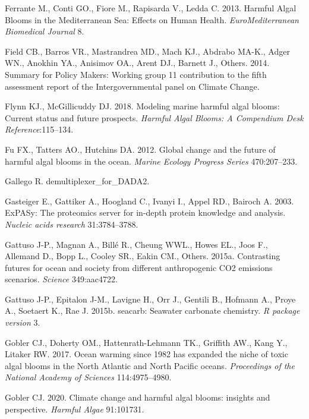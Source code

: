 \documentclass[
]{article}
\begin{document}
\leavevmode\hypertarget{ref-ferrante2013harmful}{}%
Ferrante M., Conti GO., Fiore M., Rapisarda V., Ledda C. 2013. Harmful
Algal Blooms in the Mediterranean Sea: Effects on Human Health.
\emph{EuroMediterranean Biomedical Journal} 8.

\leavevmode\hypertarget{ref-field2014summary}{}%
Field CB., Barros VR., Mastrandrea MD., Mach KJ., Abdrabo MA-K., Adger
WN., Anokhin YA., Anisimov OA., Arent DJ., Barnett J., Others. 2014.
Summary for Policy Makers: Working group 11 contribution to the fifth
assessment report of the Intergovernmental panel on Climate Change.

\leavevmode\hypertarget{ref-flynn2018modeling}{}%
Flynn KJ., McGillicuddy DJ. 2018. Modeling marine harmful algal blooms:
Current status and future prospects. \emph{Harmful Algal Blooms: A
Compendium Desk Reference}:115--134.

\leavevmode\hypertarget{ref-fu2012global}{}%
Fu FX., Tatters AO., Hutchins DA. 2012. Global change and the future of
harmful algal blooms in the ocean. \emph{Marine Ecology Progress Series}
470:207--233.

\leavevmode\hypertarget{ref-monchoscript}{}%
Gallego R. demultiplexer\_for\_DADA2.

\leavevmode\hypertarget{ref-gasteiger2003expasy}{}%
Gasteiger E., Gattiker A., Hoogland C., Ivanyi I., Appel RD., Bairoch A.
2003. ExPASy: The proteomics server for in-depth protein knowledge and
analysis. \emph{Nucleic acids research} 31:3784--3788.

\leavevmode\hypertarget{ref-gattuso2015contrasting}{}%
Gattuso J-P., Magnan A., Billé R., Cheung WWL., Howes EL., Joos F.,
Allemand D., Bopp L., Cooley SR., Eakin CM., Others. 2015a. Contrasting
futures for ocean and society from different anthropogenic CO2 emissions
scenarios. \emph{Science} 349:aac4722.

\leavevmode\hypertarget{ref-gattuso2015seacarb}{}%
Gattuso J-P., Epitalon J-M., Lavigne H., Orr J., Gentili B., Hofmann A.,
Proye A., Soetaert K., Rae J. 2015b. seacarb: Seawater carbonate
chemistry. \emph{R package version} 3.

\leavevmode\hypertarget{ref-gobler2017ocean}{}%
Gobler CJ., Doherty OM., Hattenrath-Lehmann TK., Griffith AW., Kang Y.,
Litaker RW. 2017. Ocean warming since 1982 has expanded the niche of
toxic algal blooms in the North Atlantic and North Pacific oceans.
\emph{Proceedings of the National Academy of Sciences} 114:4975--4980.

\leavevmode\hypertarget{ref-gobler2020climate}{}%
Gobler CJ. 2020. Climate change and harmful algal blooms: insights and
perspective. \emph{Harmful Algae} 91:101731.
\end{document}
